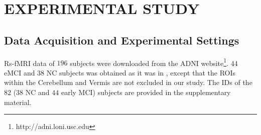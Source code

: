 \documentclass[journal]{IEEEtran}
\begin{document}
	


	\section{EXPERIMENTAL STUDY}
	\subsection{Data Acquisition and Experimental Settings}
	
	Rs-fMRI data of $196$ subjects were downloaded from the ADNI website\footnote{http://adni.loni.usc.edu}. 
	44 eMCI and 38 NC subjects was obtained as it was in  \cite{r14}, except that the ROIs within the Cerebellum and Vermis are not excluded in our study. The IDs of the $82$ ($38$ NC and $44$ early MCI) subjects are provided in the supplementary material.
	
	
%	
	
\end{document}

